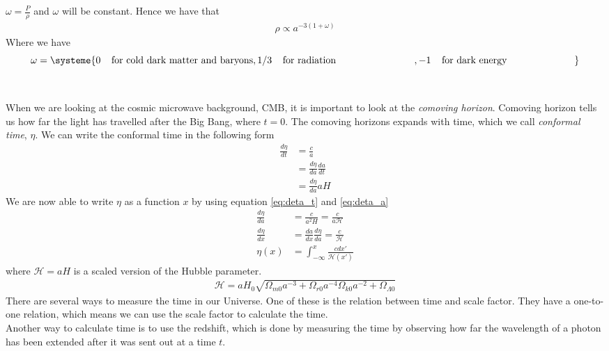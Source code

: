 \documentclass{article}
\begin{document}
\begin{multicols}{2}
    $\omega=\frac{P}{\rho}$ and $\omega$ will be constant.
Hence we have that 
\begin{align}
    \rho\propto a^{-3(1+\omega)}
\end{align}
Where we have 
\begin{equation}
\omega=
\systeme{
  0\;\;\;\; \text{for cold dark matter and baryons},
  1/3\;\;\;\; \text{for radiation} \;\;\;\;\;\;\;\;\;\;\;\;\;\;\;\;\;\;\;\;\;\;\;\;\;\;\;\;\;,
  -1\;\;\;\; \text{for dark energy}\;\;\;\;\;\;\;\;\;\;\;\;\;\;\;\;\;\;\;\;\;\;\;\;\;
} \label{eq:omega_val}
\end{equation}
\\
\\
When we are looking at the cosmic microwave background, CMB, it is important to look at the \emph{comoving horizon}. Comoving horizon tells us how far the light has travelled after the Big Bang, where $t=0$. The comoving horizons expands with time, which we call \emph{conformal time}, $\eta$. We can write the conformal time in the following form
\begin{align}
    \frac{d\eta}{dt}&=\frac{c}{a}\label{eq:deta_t}\\
    &=\frac{d\eta}{da}\frac{da}{dt}\\
    &=\frac{d\eta}{da}aH \label{eq:deta_a}
\end{align}
We are now able to write $\eta$ as a function $x$ by using equation \eqref{eq:deta_t} and \eqref{eq:deta_a}
\begin{align}
    \frac{d\eta}{da}&=\frac{c}{a^2H}=\frac{c}{a\mathcal{H}}\\
    \frac{d\eta}{dx}&=\frac{da}{dx}\frac{d\eta}{da}=\frac{c}{\mathcal{H}}\\
    \eta(x)&=\int_{-\infty}^x\frac{cdx'}{\mathcal{H}(x')} \label{eq:eta_x}
\end{align}
where $\mathcal{H}=aH$ is a scaled version of the Hubble parameter.
\begin{align}
    \mathcal{H}=aH_0\sqrt{\Omega_{m0}a^{-3}+\Omega_{r0}a^{-4}\Omega_{k0}a^{-2}+\Omega_{\Lambda0}} \label{eq:Friedmann_eq_Hp}
\end{align}
There are several ways to measure the time in our Universe. One of these is the relation between time and scale factor. They have a one-to-one relation, which means we can use the scale factor to calculate the time.\\
 Another way to calculate time is to use the redshift, which is done by measuring the time by observing how far the wavelength of a photon has been extended after it was sent out at a time $t$.

\end{multicols}
\end{document}
